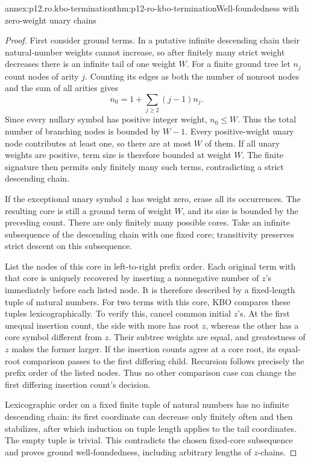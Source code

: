 \begin{annexitem}{annex:p12.ro.kbo-termination}{thm:p12-ro-kbo-termination}{Well-foundedness with zero-weight unary chains}
\begin{proof}
First consider ground terms. In a putative infinite descending chain
their natural-number weights cannot increase, so after finitely many
strict weight decreases there is an infinite tail of one weight \(W\).
For a finite ground tree let \(n_j\) count nodes of arity \(j\).
Counting its edges as both the number of nonroot nodes and the sum
of all arities gives
\[
 n_0=1+\sum_{j\geq2}(j-1)n_j.
\]
Since every nullary symbol has positive integer weight, \(n_0\leq W\).
Thus the total number of branching nodes is bounded by \(W-1\).
Every positive-weight unary node contributes at least one, so there
are at most \(W\) of them. If all unary weights are positive, term
size is therefore bounded at weight \(W\). The finite signature
then permits only finitely many such terms, contradicting a strict
descending chain.

If the exceptional unary symbol \(z\) has weight zero, erase all
its occurrences. The resulting core is still a ground term of weight
\(W\), and its size is bounded by the preceding count. There are
only finitely many possible cores. Take an infinite subsequence of
the descending chain with one fixed core; transitivity preserves
strict descent on this subsequence.

List the nodes of this core in left-to-right prefix order. Each
original term with that core is uniquely recovered by inserting a
nonnegative number of \(z\)'s immediately before each listed node.
It is therefore described by a fixed-length tuple of natural numbers.
For two terms with this core, KBO compares these tuples lexicographically.
To verify this, cancel common initial \(z\)'s. At the first unequal
insertion count, the side with more has root \(z\), whereas the
other has a core symbol different from \(z\). Their subtree weights
are equal, and greatestness of \(z\) makes the former larger.
If the insertion counts agree at a core root, its equal-root comparison
passes to the first differing child. Recursion follows precisely the
prefix order of the listed nodes. Thus no other comparison case can
change the first differing insertion count's decision.

Lexicographic order on a fixed finite tuple of natural numbers has
no infinite descending chain: its first coordinate can decrease only
finitely often and then stabilizes, after which induction on tuple
length applies to the tail coordinates. The empty tuple is trivial.
This contradicts the chosen fixed-core subsequence and proves ground
well-foundedness, including arbitrary lengths of \(z\)-chains.


\end{proof}
\end{annexitem}
